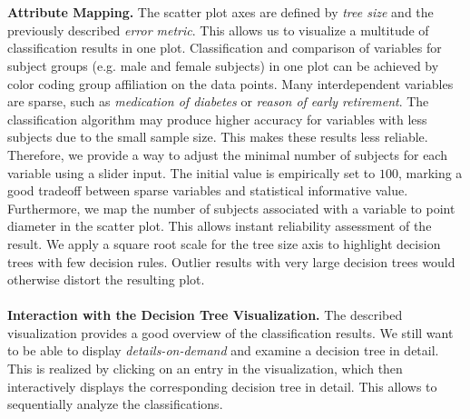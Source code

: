 \documentclass[a4paper,twoside]{style/article}
\begin{document}
\\\\
\textbf{Attribute Mapping.}
The scatter plot axes are defined by \emph{tree size} and the previously described \emph{error metric}.
This allows us to visualize a multitude of classification results in one plot.
Classification and comparison of variables for subject groups (e.g. male and female subjects) in one plot can be achieved by color coding group affiliation on the data points.
Many interdependent variables are sparse, such as \emph{medication of diabetes} or \emph{reason of early retirement}.
The classification algorithm may produce higher accuracy for variables with less subjects due to the small sample size.
This makes these results less reliable.
Therefore, we provide a way to adjust the minimal number of subjects for each variable using a slider input.
The initial value is empirically set to $100$, marking a good tradeoff between sparse variables and statistical informative value.
Furthermore, we map the number of subjects associated with a variable to point diameter in the scatter plot.
This allows instant reliability assessment of the result.
We apply a square root scale for the tree size axis to highlight decision trees with few decision rules.
Outlier results with very large decision trees would otherwise distort the resulting plot.
\\\\
\noindent \textbf{Interaction with the Decision Tree Visualization.}
The described visualization provides a good overview of the classification results.
We still want to be able to display \emph{details-on-demand} \cite{shneiderman1996} and examine a decision tree in detail.
This is realized by clicking on an entry in the visualization, which then interactively displays the corresponding decision tree in detail.
This allows to sequentially analyze the classifications.
\end{document}
